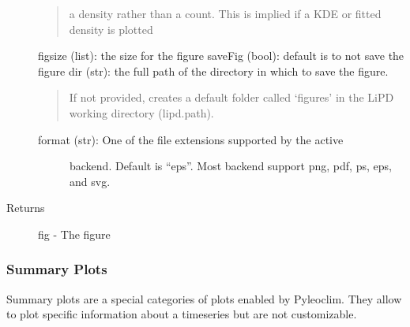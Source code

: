 \documentclass[letterpaper,10pt,english]{sphinxmanual}
\begin{document}
\begin{fulllineitems}
\begin{description}
\begin{quote}
a density rather than a count. This is implied if a KDE or
fitted density is plotted
\end{quote}

figsize (list): the size for the figure
saveFig (bool): default is to not save the figure
dir (str): the full path of the directory in which to save the figure.
\begin{quote}

If not provided, creates a default folder called ‘figures’ in the
LiPD working directory (lipd.path).
\end{quote}
\begin{description}
\item[{format (str): One of the file extensions supported by the active}] \leavevmode
backend. Default is “eps”. Most backend support png, pdf, ps, eps,
and svg.

\end{description}

\item[{Returns}] \leavevmode
fig - The figure

\end{description}

\end{fulllineitems}



\subsubsection{Summary Plots}
\label{\detokenize{Main:summary-plots}}
Summary plots are a special categories of plots enabled by Pyleoclim.
They allow to plot specific information about a timeseries but are not customizable.
\end{document}
